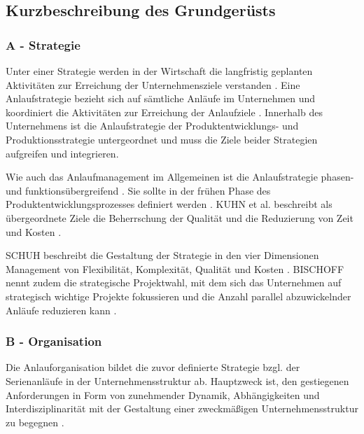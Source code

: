 \subsection*{Kurzbeschreibung des Grundgerüsts}

% 

\subsubsection*{A - Strategie}
Unter einer Strategie werden in der Wirtschaft die langfristig geplanten Aktivitäten zur Erreichung der Unternehmensziele verstanden \autocite[12]{Schuh2008}. %
% 
Eine Anlaufstrategie bezieht sich auf sämtliche Anläufe im Unternehmen und koordiniert die Aktivitäten zur Erreichung der Anlaufziele \autocite[4]{Schuh2008}. Innerhalb des Unternehmens ist die Anlaufstrategie der Produktentwicklungs- und Produktionsstrategie untergeordnet und muss die Ziele beider Strategien aufgreifen und integrieren. 
	

Wie auch das Anlaufmanagement im Allgemeinen ist die Anlaufstrategie phasen- und funktionsübergreifend \autocite{Pfohl2000}. 
Sie sollte in der frühen Phase des Produktentwicklungsprozesses definiert werden \autocite{Schuh2004}. 
KUHN et al. beschreibt als übergeordnete Ziele die Beherrschung der Qualität und die Reduzierung von Zeit und Kosten \autocite[4]{Kuhn2002}. 

SCHUH beschreibt die Gestaltung der Strategie in den vier Dimensionen Management von Flexibilität, Komplexität, Qualität und Kosten \autocite[13]{Schuh2008}. BISCHOFF nennt zudem die strategische Projektwahl, mit dem sich das Unternehmen auf strategisch wichtige Projekte fokussieren und die Anzahl parallel abzuwickelnder Anläufe reduzieren kann \autocite[43]{Bischoff2007}. 

\subsubsection*{B - Organisation}
Die Anlauforganisation bildet die zuvor definierte Strategie bzgl. der Serienanläufe in der Unternehmensstruktur ab. Hauptzweck ist, den gestiegenen Anforderungen in Form von zunehmender Dynamik, Abhängigkeiten und Interdisziplinarität mit der Gestaltung einer zweckmäßigen Unternehmensstruktur zu begegnen \autocite[55]{Schuh2008}. 

